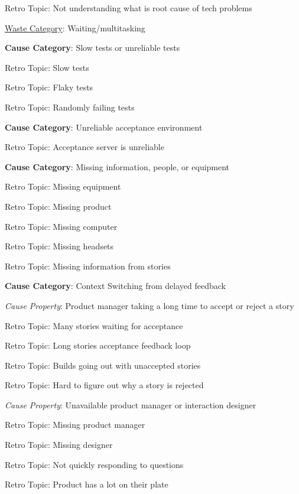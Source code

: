 \quad \quad \quad Retro Topic: Not understanding what is root cause of tech problems








\underline{Waste Category}: Waiting/multitasking

\quad \textbf{Cause Category}: Slow tests or unreliable tests

\quad \quad Retro Topic: Slow tests

\quad \quad Retro Topic: Flaky tests

\quad \quad Retro Topic: Randomly failing tests

\quad \textbf{Cause Category}: Unreliable acceptance environment

\quad \quad Retro Topic: Acceptance server is unreliable

\quad \textbf{Cause Category}: Missing information, people, or equipment

\quad \quad Retro Topic: Missing equipment

\quad \quad Retro Topic: Missing product

\quad \quad Retro Topic: Missing computer

\quad \quad Retro Topic: Missing headsets

\quad \quad Retro Topic: Missing information from stories

\quad \textbf{Cause Category}: Context Switching from delayed feedback

\quad \quad \textit{Cause Property}: Product manager taking a long time to accept or reject a story

\quad \quad \quad Retro Topic: Many stories waiting for acceptance

\quad \quad \quad Retro Topic: Long stories acceptance feedback loop

\quad \quad \quad Retro Topic: Builds going out with unaccepted stories

\quad \quad \quad Retro Topic: Hard to figure out why a story is rejected

\quad \quad \textit{Cause Property}: Unavailable product manager or interaction designer

\quad \quad \quad Retro Topic: Missing product manager

\quad \quad \quad Retro Topic: Missing designer

\quad \quad \quad Retro Topic: Not quickly responding to questions

\quad \quad \quad Retro Topic: Product has a lot on their plate

